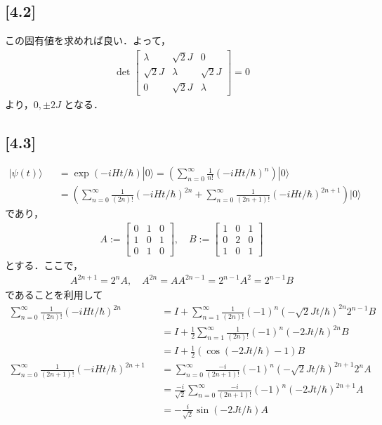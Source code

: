 \documentclass[12pt,dvipdfmx]{jsarticle}
\begin{document}
\subsection*{\large{[4.2]}}
この固有値を求めれば良い．よって，
\begin{eqnarray}
  \det
  \begin{bmatrix}
    \lambda & \sqrt{2}J & 0\\
    \sqrt{2}J & \lambda & \sqrt{2}J\\
    0 & \sqrt{2}J & \lambda
  \end{bmatrix}
  =0
\end{eqnarray}
より，$0,\pm 2J$
となる．
\subsection*{\large{[4.3]}}
\begin{eqnarray}
  |\psi(t)\rangle &&= \exp( -iHt/\hbar )|0\rangle = \left( \sum_{n=0}^{\infty}\frac{1}{n!}(-iHt/\hbar)^n  \right)|0\rangle\\
  &&= \left( \sum_{n=0}^{\infty}\frac{1}{(2n)!}(-iHt/\hbar)^{2n} + \sum_{n=0}^{\infty}\frac{1}{(2n+1)!}(-iHt/\hbar)^{2n+1} \right)|0\rangle
\end{eqnarray}
であり，
\begin{eqnarray}
  A:= 
  \begin{bmatrix}
    0 & 1& 0\\
    1 & 0 & 1\\
    0 & 1& 0
  \end{bmatrix},\quad
  B:=
  \begin{bmatrix}
    1 & 0 & 1\\
    0 & 2& 0\\
    1 & 0 & 1
  \end{bmatrix}
\end{eqnarray}
とする．ここで，
\begin{eqnarray}
  A^{2n+1} = 2^nA, \quad A^{2n} = A A^{2n-1} = 2^{n-1}A^2 = 2^{n-1}B 
\end{eqnarray}
であることを利用して
\begin{eqnarray}
  \sum_{n=0}^{\infty}\frac{1}{(2n)!}(-iHt/\hbar)^{2n} &&= I + \sum_{n=1}^{\infty} \frac{1}{(2n)!}(-1)^n (-\sqrt{2}J t/\hbar)^{2n}2^{n-1} B\\
  &&= I + \frac{1}{2}\sum_{n=1}^{\infty} \frac{1}{(2n)!}(-1)^n (-2J t/\hbar)^{2n} B\\
  &&= I + \frac{1}{2}\left( \cos(-2J t/\hbar)-1 \right)B\\
  \sum_{n=0}^{\infty}\frac{1}{(2n+1)!}(-iHt/\hbar)^{2n+1} &&= \sum_{n=0}^{\infty} \frac{-i}{(2n+1)!}(-1)^n (-\sqrt{2}J t/\hbar)^{2n+1}2^n A\\
  &&= \frac{-i}{\sqrt{2}}\sum_{n=0}^{\infty} \frac{-i}{(2n+1)!}(-1)^n (-2J t/\hbar)^{2n+1} A\\
  &&= -\frac{i}{\sqrt{2}}\sin(-2J t/\hbar)A
\end{eqnarray}
\end{document}
